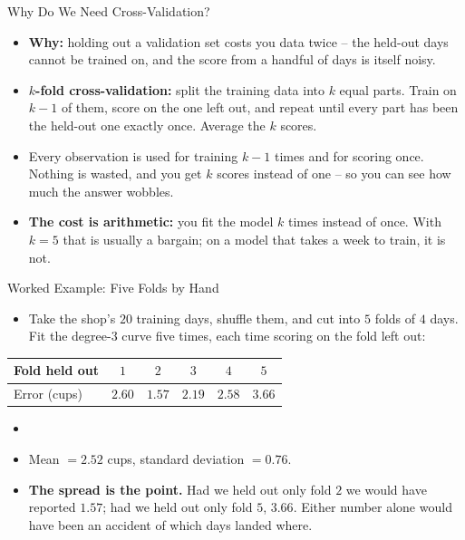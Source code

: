 \begin{frame}{Why Do We Need Cross-Validation?}
\begin{itemize}
  \item \textbf{Why:} holding out a validation set costs you data twice -- the held-out days cannot be trained on, and the score from a handful of days is itself noisy.
  \pause
  \item \textbf{$k$-fold cross-validation:} split the training data into $k$ equal parts. Train on $k-1$ of them, score on the one left out, and repeat until every part has been the held-out one exactly once. Average the $k$ scores.
  \pause
  \item Every observation is used for training $k-1$ times and for scoring once. Nothing is wasted, and you get $k$ scores instead of one -- so you can see how much the answer wobbles.
  \pause
  \item \textbf{The cost is arithmetic:} you fit the model $k$ times instead of once. With $k = 5$ that is usually a bargain; on a model that takes a week to train, it is not.
\end{itemize}
\end{frame}

\begin{frame}{Worked Example: Five Folds by Hand}
\begin{itemize}
  \item Take the shop's $20$ training days, shuffle them, and cut into $5$ folds of $4$ days. Fit the degree-$3$ curve five times, each time scoring on the fold left out:
\end{itemize}
\centering
\small
\begin{tabular}{l|ccccc}
Fold held out & $1$ & $2$ & $3$ & $4$ & $5$ \\
\hline
Error (cups)  & $2.60$ & $1.57$ & $2.19$ & $2.58$ & $3.66$ \\
\end{tabular}

\vspace{0.4em}
\raggedright
\begin{itemize}
  \item[] \pause
  \item Mean $= 2.52$ cups, standard deviation $= 0.76$. \pause
  \item \textbf{The spread is the point.} Had we held out only fold $2$ we would have reported $1.57$; had we held out only fold $5$, $3.66$. Either number alone would have been an accident of which days landed where.
\end{itemize}
\end{frame}

